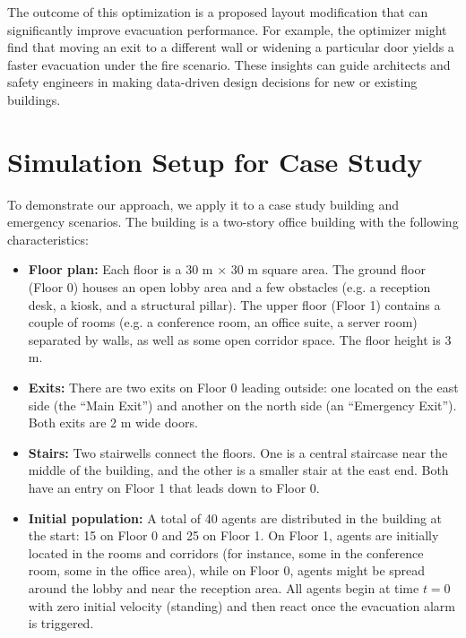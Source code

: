 \documentclass[11pt,a4paper]{article}
\begin{document}
The outcome of this optimization is a proposed layout modification that can significantly improve evacuation performance. For example, the optimizer might find that moving an exit to a different wall or widening a particular door yields a faster evacuation under the fire scenario. These insights can guide architects and safety engineers in making data-driven design decisions for new or existing buildings.

\section{Simulation Setup for Case Study}
To demonstrate our approach, we apply it to a case study building and emergency scenarios. The building is a two-story office building with the following characteristics:
\begin{itemize}
    \item \textbf{Floor plan:} Each floor is a 30 m $\times$ 30 m square area. The ground floor (Floor 0) houses an open lobby area and a few obstacles (e.g. a reception desk, a kiosk, and a structural pillar). The upper floor (Floor 1) contains a couple of rooms (e.g. a conference room, an office suite, a server room) separated by walls, as well as some open corridor space. The floor height is 3 m.
    \item \textbf{Exits:} There are two exits on Floor 0 leading outside: one located on the east side (the ``Main Exit'') and another on the north side (an ``Emergency Exit''). Both exits are 2 m wide doors.
    \item \textbf{Stairs:} Two stairwells connect the floors. One is a central staircase near the middle of the building, and the other is a smaller stair at the east end. Both have an entry on Floor 1 that leads down to Floor 0.
    \item \textbf{Initial population:} A total of 40 agents are distributed in the building at the start: 15 on Floor 0 and 25 on Floor 1. On Floor 1, agents are initially located in the rooms and corridors (for instance, some in the conference room, some in the office area), while on Floor 0, agents might be spread around the lobby and near the reception area. All agents begin at time $t=0$ with zero initial velocity (standing) and then react once the evacuation alarm is triggered.
\end{itemize}
\end{document}
